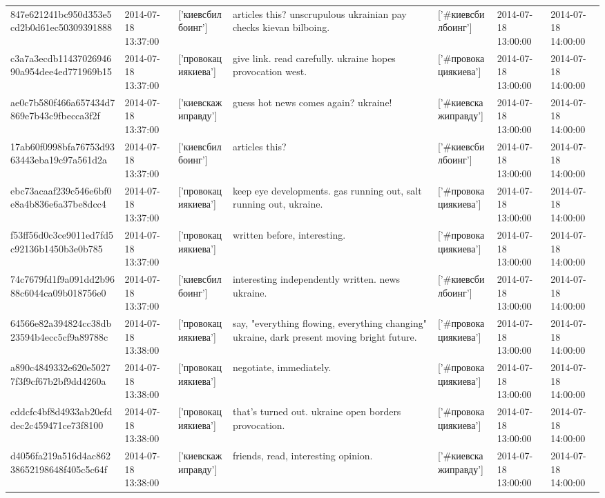 \begin{tabular}{lllllll}
847e621241bc950d353e5cd2b0d61ec50309391888 & 2014-07-18 13:37:00 & ['киевсбилбоинг'] & articles this? unscrupulous ukrainian pay checks kievan bilboing. & ['#киевсбилбоинг'] & 2014-07-18 13:00:00 & 2014-07-18 14:00:00 \\
c3a7a3ecdb1143702694690a954dee4ed771969b15 & 2014-07-18 13:37:00 & ['провокациякиева'] & give link. read carefully. ukraine hopes provocation west. & ['#провокациякиева'] & 2014-07-18 13:00:00 & 2014-07-18 14:00:00 \\
ae0c7b580f466a657434d7869e7b43c9fbecca3f2f & 2014-07-18 13:37:00 & ['киевскажиправду'] & guess hot news comes again? ukraine! & ['#киевскажиправду'] & 2014-07-18 13:00:00 & 2014-07-18 14:00:00 \\
17ab60f0998bfa76753d9363443eba19c97a561d2a & 2014-07-18 13:37:00 & ['киевсбилбоинг'] & articles this? & ['#киевсбилбоинг'] & 2014-07-18 13:00:00 & 2014-07-18 14:00:00 \\
ebc73acaaf239c546e6bf0e8a4b836e6a37be8dcc4 & 2014-07-18 13:37:00 & ['провокациякиева'] & keep eye developments. gas running out, salt running out, ukraine. & ['#провокациякиева'] & 2014-07-18 13:00:00 & 2014-07-18 14:00:00 \\
f53ff56d0c3ce9011ed7fd5c92136b1450b3e0b785 & 2014-07-18 13:37:00 & ['провокациякиева'] & written before, interesting. & ['#провокациякиева'] & 2014-07-18 13:00:00 & 2014-07-18 14:00:00 \\
74c7679fd1f9a091dd2b9688c6044ca09b018756e0 & 2014-07-18 13:37:00 & ['киевсбилбоинг'] & interesting independently written. news ukraine. & ['#киевсбилбоинг'] & 2014-07-18 13:00:00 & 2014-07-18 14:00:00 \\
64566e82a394824cc38db23594b4ecc5cf9a89788c & 2014-07-18 13:38:00 & ['провокациякиева'] & say, "everything flowing, everything changing" ukraine, dark present moving bright future. & ['#провокациякиева'] & 2014-07-18 13:00:00 & 2014-07-18 14:00:00 \\
a890c4849332e620e50277f3f9cf67b2bf9dd4260a & 2014-07-18 13:38:00 & ['провокациякиева'] & negotiate, immediately. & ['#провокациякиева'] & 2014-07-18 13:00:00 & 2014-07-18 14:00:00 \\
cddcfc4bf8d4933ab20efddec2c459471ce73f8100 & 2014-07-18 13:38:00 & ['провокациякиева'] & that's turned out. ukraine open borders provocation. & ['#провокациякиева'] & 2014-07-18 13:00:00 & 2014-07-18 14:00:00 \\
d4056fa219a516d4ac86238652198648f405c5c64f & 2014-07-18 13:38:00 & ['киевскажиправду'] & friends, read, interesting opinion. & ['#киевскажиправду'] & 2014-07-18 13:00:00 & 2014-07-18 14:00:00 \\

\end{tabular}
